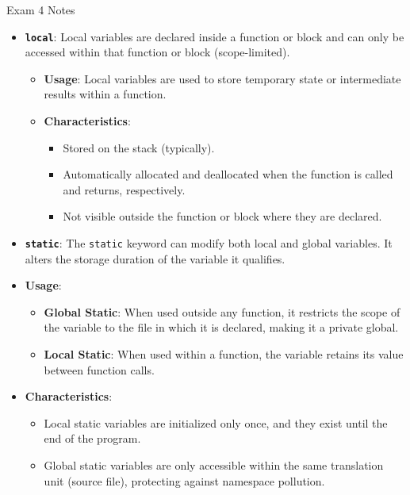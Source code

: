 \begin{examnotes}{Exam 4 Notes}
\begin{highlight}
\begin{itemize}
\begin{itemize}
\begin{itemize}
                \end{itemize}
            \end{itemize}
            \item \textbf{\texttt{local}}: Local variables are declared inside a function or block and can only be accessed within that function or block (scope-limited).
            \begin{itemize}
                \item \textbf{Usage}: Local variables are used to store temporary state or intermediate results within a function.
                \item \textbf{Characteristics}:
                \begin{itemize}
                    \item Stored on the stack (typically).
                    \item Automatically allocated and deallocated when the function is called and returns, respectively.
                    \item Not visible outside the function or block where they are declared.
                \end{itemize}
            \end{itemize}
            \item \textbf{\texttt{static}}: The \texttt{static} keyword can modify both local and global variables. It alters the storage duration of the variable it qualifies.
            \item \textbf{Usage}:
            \begin{itemize}
                \item \textbf{Global Static}: When used outside any function, it restricts the scope of the variable to the file in which it is declared, making it a private global.
                \item \textbf{Local Static}: When used within a function, the variable retains its value between function calls.
            \end{itemize}
            \item \textbf{Characteristics}:
            \begin{itemize}
                \item Local static variables are initialized only once, and they exist until the end of the program.
                \item Global static variables are only accessible within the same translation unit (source file), protecting against namespace pollution.
            \end{itemize}
        \end{itemize}


\end{highlight}
\end{examnotes}
